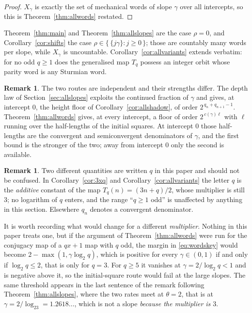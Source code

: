 \documentclass[11pt,reqno]{amsart}
\theoremstyle{plain}
\theoremstyle{definition}
\newtheorem{remark}[theorem]{Remark}
\begin{document}
\begin{proof}
$X_\gamma$ is exactly the set of mechanical words of slope $\gamma$ over all
intercepts, so this is Theorem~\ref{thm:allwords} restated.
\end{proof}

Theorem~\ref{thm:main} and Theorem~\ref{thm:allslopes} are the case $\rho=0$,
and Corollary~\ref{cor:shifts} the case $\rho\in\{\,\{j\gamma\}:j\ge0\,\}$; those
are countably many words per slope, while $X_\gamma$ is uncountable.
Corollary~\ref{cor:allvariants} extends verbatim: for no odd $q\ge1$ does the
generalised map $T_q$ possess an integer orbit whose parity word is any Sturmian
word.

\begin{remark}\label{rem:tworoutes}
The two routes are independent and their strengths differ. The depth law of
Section~\ref{sec:allslopes} exploits the continued fraction of $\gamma$ and
gives, at intercept $0$, the height floor of Corollary~\ref{cor:allshadow}, of
order $2^{\,q_n+q_{n+1}-1}$. Theorem~\ref{thm:allwords} gives, at every
intercept, a floor of order $2^{\,c(\gamma)\ell}$ with $\ell$ running over the
half-lengths of the initial squares. At intercept $0$ those half-lengths are the
convergent and semiconvergent denominators of $\gamma$, and the first bound is
the stronger of the two; away from intercept $0$ only the second is available.
\end{remark}

\begin{remark}\label{rem:multiplier}
Two different quantities are written $q$ in this paper and should not be
confused. In Corollary~\ref{cor:3xq} and Corollary~\ref{cor:allvariants} the
letter $q$ is the \emph{additive} constant of the map $T_q(n)=(3n+q)/2$, whose
multiplier is still $3$; no logarithm of $q$ enters, and the range ``$q\ge1$
odd'' is unaffected by anything in this section. Elsewhere $q_n$ denotes a
convergent denominator.

It is worth recording what would change for a different \emph{multiplier}.
Nothing in this paper treats one, but if the argument of
Theorem~\ref{thm:allwords} were run for the conjugacy map of a $qx+1$ map with
$q$ odd, the margin in \eqref{eq:wordskey} would become
$2-\max(1,\gamma\log_2q)$, which is positive for every $\gamma\in(0,1)$ if and
only if $\log_2q\le2$, that is only for $q=3$. For $q\ge5$ it vanishes at
$\gamma=2/\log_2q<1$ and is negative above it, so the initial-square route would
fail at the large slopes. The same threshold appears in the last sentence of the
remark following Theorem~\ref{thm:allslopes}, where the two rates meet at
$\theta=2$, that is at $\gamma=2/\log_23=1.2618\ldots$, which is not a slope
\emph{because the multiplier is $3$}.
\end{remark}
\end{document}
